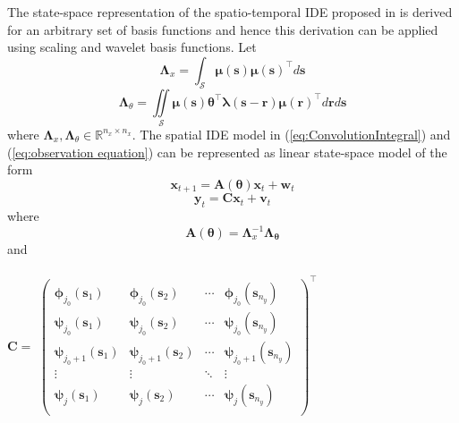 \documentclass[11pt,draftcls,onecolumn,peerreview]{IEEEtran}
\begin{document}
The state-space representation of the spatio-temporal IDE proposed in \cite{Dewar2009} is derived for an arbitrary set of basis functions and hence this derivation can be applied using scaling and wavelet basis functions. Let
\begin{equation}
 \mathbf{\Lambda}_{x}=\int_{\mathcal{S}}\boldsymbol\mu\left(\mathbf{s}\right)\boldsymbol\mu\left(\mathbf{s}\right)^\top d\mathbf{s}
\label{eq:ConstructionIntegral1}
\end{equation}
\begin{equation}
 \mathbf{\Lambda}_{\theta}=\iint\limits_{\mathcal{S}}\boldsymbol\mu\left(\mathbf{s}\right)\boldsymbol\theta^\top \boldsymbol\lambda\left(\mathbf{s-r}\right)\boldsymbol\mu\left(\mathbf{r}\right)^\top d\mathbf{r}d\mathbf{s}
\label{eq:ConstructionIntegral2}
\end{equation}
where $\boldsymbol\Lambda_{x}, \boldsymbol\Lambda_{\theta} \in \mathbb{R}^{n_x \times n_x}$. The spatial IDE model in (\ref{eq:ConvolutionIntegral}) and (\ref{eq:observation equation}) can be represented as linear state-space model of the form  
\begin{equation}
 \mathbf{x}_{t+1}=\mathbf{A}\left(\boldsymbol\theta\right)\mathbf{x}_t+\mathbf{w}_t
\end{equation}
\begin{equation}
\mathbf{y}_t=\mathbf{C}\mathbf{x}_t+\mathbf{v}_t
\end{equation}
where 
\begin{equation}
 \mathbf{A}\left(\boldsymbol\theta\right)=\mathbf{\Lambda}_{x}^{-1}\mathbf{\Lambda_{\theta}}
\label{eq:TransitionMatrix}
\end{equation}
and  \\ \\ 
$\mathbf{C}=$
$\begin{pmatrix}
\boldsymbol\phi_{j_0}\left(\mathbf{s}_1\right) & \boldsymbol\phi_{j_0}\left(\mathbf{s}_2\right)  &\cdots &\boldsymbol\phi_{j_0}\left(\mathbf{s}_{n_y}\right) \\
\boldsymbol\psi_{j_0}\left(\mathbf{s}_1\right) & \boldsymbol\psi_{j_0}\left(\mathbf{s}_2\right)  &\cdots &\boldsymbol\psi_{j_0}\left(\mathbf{s}_{n_y}\right) \\
\boldsymbol\psi_{j_0+1}\left(\mathbf{s}_1\right) & \boldsymbol\psi_{j_0+1}\left(\mathbf{s}_2\right)  &\cdots &\boldsymbol\psi_{j_0+1}\left(\mathbf{s}_{n_y}\right) \\
\vdots & \vdots & \ddots& \vdots \\
\boldsymbol\psi_{j}\left(\mathbf{s}_1\right) & \boldsymbol\psi_{j}\left(\mathbf{s}_2\right)  &\cdots &\boldsymbol\psi_{j}\left(\mathbf{s}_{n_y}\right) \\
\end{pmatrix}^{\top}$ \\ \\
\end{document}
